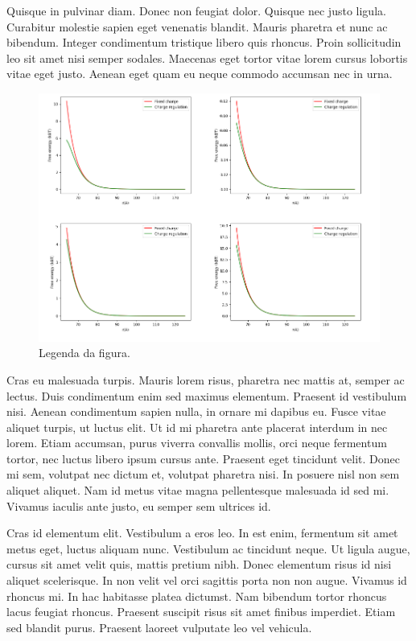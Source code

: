 \documentclass[twoside]{article}
\begin{document}
\begin{multicols}{2}
  Quisque in pulvinar diam. Donec non feugiat dolor. Quisque nec justo ligula. Curabitur molestie sapien eget venenatis blandit. Mauris pharetra et nunc ac bibendum. Integer condimentum tristique libero quis rhoncus. Proin sollicitudin leo sit amet nisi semper sodales. Maecenas eget tortor vitae lorem cursus lobortis vitae eget justo. Aenean eget quam eu neque commodo accumsan nec in urna.

  \begin{figure}[H]
    \centering
    \includegraphics[scale=0.4]{figurateste2.png}
    \caption{Legenda da figura.}
    \label{fig2}
  \end{figure}
  Cras eu malesuada turpis. Mauris lorem risus, pharetra nec mattis at, semper ac lectus. Duis condimentum enim sed maximus elementum. Praesent id vestibulum nisi. Aenean condimentum sapien nulla, in ornare mi dapibus eu. Fusce vitae aliquet turpis, ut luctus elit. Ut id mi pharetra ante placerat interdum in nec lorem. Etiam accumsan, purus viverra convallis mollis, orci neque fermentum tortor, nec luctus libero ipsum cursus ante. Praesent eget tincidunt velit. Donec mi sem, volutpat nec dictum et, volutpat pharetra nisi. In posuere nisl non sem aliquet aliquet. Nam id metus vitae magna pellentesque malesuada id sed mi. Vivamus iaculis ante justo, eu semper sem ultrices id.

  Cras id elementum elit. Vestibulum a eros leo. In est enim, fermentum sit amet metus eget, luctus aliquam nunc. Vestibulum ac tincidunt neque. Ut ligula augue, cursus sit amet velit quis, mattis pretium nibh. Donec elementum risus id nisi aliquet scelerisque. In non velit vel orci sagittis porta non non augue. Vivamus id rhoncus mi. In hac habitasse platea dictumst. Nam bibendum tortor rhoncus lacus feugiat rhoncus. Praesent suscipit risus sit amet finibus imperdiet. Etiam sed blandit purus. Praesent laoreet vulputate leo vel vehicula.


\end{multicols}
\end{document}
